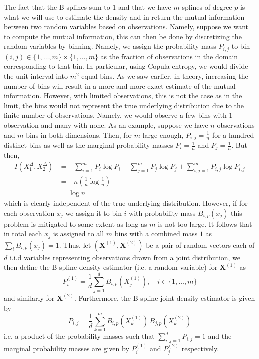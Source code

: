 \documentclass[../Thesis.tex]{subfiles}
\begin{document}
The fact that the B-splines sum to $1$ and that we have $m$ splines of degree $p$ is what we will use to estimate the density and in return the mutual information between two random variables based on observations. Namely, suppose we want to compute the mutual information, this can then be done by discretizing the random variables by binning. Namely, we assign the probability mass $P_{i,j}$ to bin $(i,j)\in \{1,\dots, m\} \times \{1,\dots, m\}$ as the fraction of observations in the domain corresponding to that bin. In particular, using Copula entropy, we would divide the unit interval into $m^2$ equal bins. As we saw earlier, in theory, increasing the number of bins will result in a more and more exact estimate of the mutual information. However, with limited observations, this is not the case as in the limit, the bins would not represent the true underlying distribution due to the finite number of observations. Namely, we would observe a few bins with $1$ observation and many with none. As an example, suppose we have $n$ observations and $m$ bins in both dimensions. Then, for $m$ large enough, $P_{i,j} = \frac{1}{n}$ for a hundred distinct bins as well as the marginal probability masses $P_i = \frac{1}{n}$ and $P_j = \frac{1}{n}$. But then,
\begin{align*}
    I\left(X_1^\Delta,X_2^\Delta\right) & = - \sum_{i=1}^{m} P_i \log P_i - \sum_{j=1}^{m} P_j \log P_j + \sum_{i,j = 1}^{m} P_{i,j} \log P_{i,j} \\
                                        & = - n \left(\frac{1}{n} \log \frac{1}{n}\right)                                                         \\
                                        & = \log n
\end{align*}
which is clearly independent of the true underlying distribution. However, if for each observation $x_j$ we assign it to bin $i$ with probability mass $B_{i,p}\left(x_j\right)$ this problem is mitigated to some extent as long as $m$ is not too large. It follows that in total each $x_j$ is assigned to all $m$ bins with a combined mass $1$ as $\sum_i B_{i,p} ( x_j ) = 1$. Thus, let $\left(\boldsymbol X^{(1)}, \boldsymbol X^{(2)}\right)$ be a pair of random vectors each of $d$ i.i.d variables representing observations drawn from a joint distribution, we then define the B-spline density estimator (i.e. a random variable) for $\boldsymbol X^{(1)}$ as 
$$P_{i}^{(1)} = \frac{1}{d} \sum_{j = 1}^{d} B_{i,p}\left(X_{j}^{(1)}\right), \quad i\in \{1,\dots, m\}$$
and similarly for $\boldsymbol X^{(2)}$. Furthermore, the B-spline joint density estimator is given by 
$$P_{i,j} = \frac{1}{d} \sum_{k= 1}^{m} B_{i,p}\left(X^{(1)}_k\right) \, B_{j,p}\left(X^{(2)}_k\right)$$
i.e. a product of the probability masses such that $\sum_{i,j = 1}^d P_{i,j} = 1$ and the marginal probability masses are given by $P_{i}^{(1)}$ and $P_{j}^{(2)}$ respectively.
\end{document}
